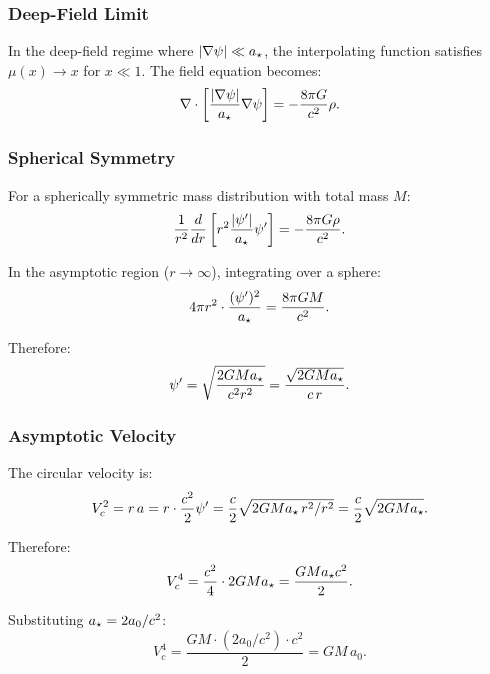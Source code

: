 \subsubsection{Deep-Field Limit}

In the deep-field regime where $|\nabla\psi| \ll a_\star$, the interpolating 
function satisfies $\mu(x) \to x$ for $x \ll 1$. The field equation becomes:
\begin{equation}
\nabla\cdot\left[\frac{|\nabla\psi|}{a_\star}\nabla\psi\right] = -\frac{8\pi G}{c^2}\rho.
\end{equation}

\subsubsection{Spherical Symmetry}

For a spherically symmetric mass distribution with total mass $M$:
\begin{equation}
\frac{1}{r^2}\frac{d}{dr}\left[r^2 \frac{|\psi'|}{a_\star}\psi'\right] = -\frac{8\pi G\rho}{c^2}.
\end{equation}

In the asymptotic region ($r \to \infty$), integrating over a sphere:
\begin{equation}
4\pi r^2 \cdot \frac{(\psi')^2}{a_\star} = \frac{8\pi GM}{c^2}.
\end{equation}

Therefore:
\begin{equation}
\psi' = \sqrt{\frac{2GMa_\star}{c^2 r^2}} = \frac{\sqrt{2GMa_\star}}{c\,r}.
\end{equation}

\subsubsection{Asymptotic Velocity}

The circular velocity is:
\begin{equation}
V_c^2 = r\,a = r \cdot \frac{c^2}{2}\psi' = \frac{c}{2}\sqrt{2GMa_\star\,r^2/r^2} = \frac{c}{2}\sqrt{2GMa_\star}.
\end{equation}

Therefore:
\begin{equation}
V_c^4 = \frac{c^2}{4} \cdot 2GMa_\star = \frac{GMa_\star c^2}{2}.
\end{equation}

Substituting $a_\star = 2a_0/c^2$:
\begin{equation}
V_c^4 = \frac{GM \cdot (2a_0/c^2) \cdot c^2}{2} = GM\,a_0.
\end{equation}

